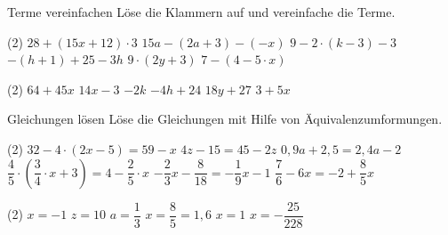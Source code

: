 \documentclass[12pt,a5paper,landscape]{scrartcl}
\begin{document}
\begin{karte1}{Terme vereinfachen}
	Löse die Klammern auf und vereinfache die Terme.
	
	\begin{tasks}(2)
		\task $28 + (15x + 12) \cdot 3$
		\task $15a - (2a + 3) - (-x)$
		\task $9 - 2\cdot ( k-3) - 3$
		\task $-(h + 1) + 25 -3h$
		\task $9 \cdot(2y + 3)$
		\task $7-(4-5\cdot x)$
	\end{tasks}
\end{karte1}

\begin{loesungskarte}
	\begin{tasks}(2)
		\task $64 + 45x$
		\task $14x - 3$
		\task $-2k$
		\task $-4h + 24$
		\task $18y + 27$
		\task $3 + 5x$
	\end{tasks}
\end{loesungskarte}

\begin{karte1}{Gleichungen lösen}
	Löse die Gleichungen mit Hilfe von Äquivalenzumformungen.
	
	\begin{tasks}(2)
		\task $32 - 4\cdot (2x - 5) = 59 -x $
		\task $4z - 15 = 45 - 2z$
		\task $0,9a + 2,5 = 2,4a - 2$
		\task $\dfrac{4}{5} \cdot \left( \dfrac{3}{4} \cdot x + 3 \right) = 4 - \dfrac{2}{5}\cdot  x$
		\task $-\dfrac{2}{3}x - \dfrac{8}{18} = -\dfrac{1}{9}x - 1$
		\task $\dfrac{7}{6} - 6x = -2 + \dfrac{8}{5}x$
	\end{tasks}
\end{karte1}

\begin{loesungskarte}
	\begin{tasks}(2)
		\task $x = -1$
		\task $z = 10$
		\task $a = \dfrac{1}{3}$
		\task $x = \dfrac{8}{5} = 1,6$
		\task $x = 1$
		\task $x = -\dfrac{25}{228}$
	\end{tasks}
\end{loesungskarte}
\end{document}
